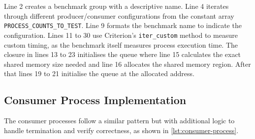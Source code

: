 Line 2 creates a benchmark group with a descriptive name. Line 4 iterates through different producer/consumer configurations from the constant array \texttt{PROCESS\_COUNTS\_TO\_TEST}. Line 9 formats the benchmark name to indicate the configuration. Lines 11 to 30 use Criterion's \texttt{iter\_custom} method to measure custom timing, as the benchmark itself measures process execution time. The closure in lines 13 to 23 initialises the queue where line 15 calculates the exact shared memory size needed and line 16 allocates the shared memory region. After that lines 19 to 21 initialise the queue at the allocated address.

\subsection{Consumer Process Implementation}
The consumer processes follow a similar pattern but with additional logic to handle termination and verify correctness, as shown in \cref{lst:consumer-process}.


